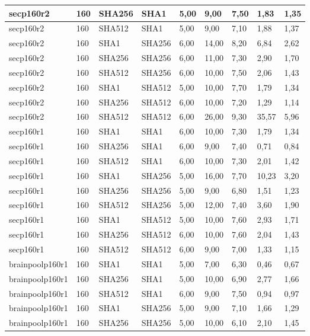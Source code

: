 \begin{longtable}{| l | l | l | l | l |l |l |l |l |}
secp160r2 & 160 & SHA256 & SHA1 & 5,00 & 9,00 & 7,50 & 1,83 & 1,35 \\ \hline 
secp160r2 & 160 & SHA512 & SHA1 & 5,00 & 9,00 & 7,10 & 1,88 & 1,37 \\ \hline 
secp160r2 & 160 & SHA1 & SHA256 & 6,00 & 14,00 & 8,20 & 6,84 & 2,62 \\ \hline 
secp160r2 & 160 & SHA256 & SHA256 & 6,00 & 11,00 & 7,30 & 2,90 & 1,70 \\ \hline 
secp160r2 & 160 & SHA512 & SHA256 & 6,00 & 10,00 & 7,50 & 2,06 & 1,43 \\ \hline 
secp160r2 & 160 & SHA1 & SHA512 & 5,00 & 10,00 & 7,70 & 1,79 & 1,34 \\ \hline 
secp160r2 & 160 & SHA256 & SHA512 & 6,00 & 10,00 & 7,20 & 1,29 & 1,14 \\ \hline 
secp160r2 & 160 & SHA512 & SHA512 & 6,00 & 26,00 & 9,30 & 35,57 & 5,96 \\ \hline 
secp160r1 & 160 & SHA1 & SHA1 & 6,00 & 10,00 & 7,30 & 1,79 & 1,34 \\ \hline 
secp160r1 & 160 & SHA256 & SHA1 & 6,00 & 9,00 & 7,40 & 0,71 & 0,84 \\ \hline 
secp160r1 & 160 & SHA512 & SHA1 & 6,00 & 10,00 & 7,30 & 2,01 & 1,42 \\ \hline 
secp160r1 & 160 & SHA1 & SHA256 & 5,00 & 16,00 & 7,70 & 10,23 & 3,20 \\ \hline 
secp160r1 & 160 & SHA256 & SHA256 & 5,00 & 9,00 & 6,80 & 1,51 & 1,23 \\ \hline 
secp160r1 & 160 & SHA512 & SHA256 & 5,00 & 12,00 & 7,40 & 3,60 & 1,90 \\ \hline 
secp160r1 & 160 & SHA1 & SHA512 & 5,00 & 10,00 & 7,60 & 2,93 & 1,71 \\ \hline 
secp160r1 & 160 & SHA256 & SHA512 & 6,00 & 10,00 & 7,60 & 2,04 & 1,43 \\ \hline 
secp160r1 & 160 & SHA512 & SHA512 & 6,00 & 9,00 & 7,00 & 1,33 & 1,15 \\ \hline 
brainpoolp160r1 & 160 & SHA1 & SHA1 & 5,00 & 7,00 & 6,30 & 0,46 & 0,67 \\ \hline 
brainpoolp160r1 & 160 & SHA256 & SHA1 & 5,00 & 10,00 & 6,90 & 2,77 & 1,66 \\ \hline 
brainpoolp160r1 & 160 & SHA512 & SHA1 & 6,00 & 9,00 & 7,50 & 0,94 & 0,97 \\ \hline 
brainpoolp160r1 & 160 & SHA1 & SHA256 & 5,00 & 9,00 & 7,10 & 1,66 & 1,29 \\ \hline 
brainpoolp160r1 & 160 & SHA256 & SHA256 & 5,00 & 10,00 & 6,10 & 2,10 & 1,45 \\ \hline 

\end{longtable}
